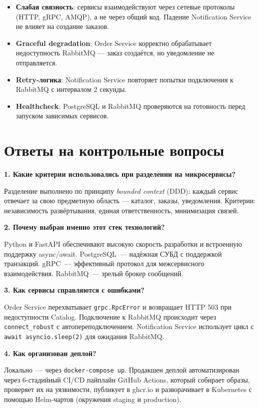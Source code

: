 \documentclass[14pt]{article}
\begin{document}
\begin{itemize}
    \item \textbf{Слабая связность}: сервисы взаимодействуют через сетевые протоколы (HTTP, gRPC, AMQP), а не через общий код. Падение Notification Service не влияет на создание заказов.
    \item \textbf{Graceful degradation}: Order Service корректно обрабатывает недоступность RabbitMQ --- заказ создаётся, но уведомление не отправляется.
    \item \textbf{Retry-логика}: Notification Service повторяет попытки подключения к RabbitMQ с интервалом 2 секунды.
    \item \textbf{Healthcheck}: PostgreSQL и RabbitMQ проверяются на готовность перед запуском зависимых сервисов.
\end{itemize}

\section{Ответы на контрольные вопросы}

\textbf{1. Какие критерии использовались при разделении на микросервисы?}

Разделение выполнено по принципу \emph{bounded context} (DDD): каждый сервис отвечает за свою предметную область --- каталог, заказы, уведомления. Критерии: независимость развёртывания, единая ответственность, минимизация связей.

\textbf{2. Почему выбран именно этот стек технологий?}

Python и FastAPI обеспечивают высокую скорость разработки и встроенную поддержку async/await. PostgreSQL~--- надёжная СУБД с поддержкой транзакций. gRPC~--- эффективный протокол для межсервисного взаимодействия. RabbitMQ~--- зрелый брокер сообщений.

\textbf{3. Как сервисы справляются с ошибками?}

Order Service перехватывает \texttt{grpc.RpcError} и возвращает HTTP 503 при недоступности Catalog. Подключение к RabbitMQ происходит через \texttt{connect\_robust} с автопереподключением. Notification Service использует цикл с \texttt{await asyncio.sleep(2)} для ожидания RabbitMQ.

\textbf{4. Как организован деплой?}

Локально~--- через \texttt{docker-compose up}. Продакшен деплой автоматизирован через 6-стадийный CI/CD пайплайн GitHub Actions, который собирает образы, проверяет их на уязвимости, публикует в ghcr.io и разворачивает в Kubernetes с помощью Helm-чартов (окружения staging и production).
\end{document}
